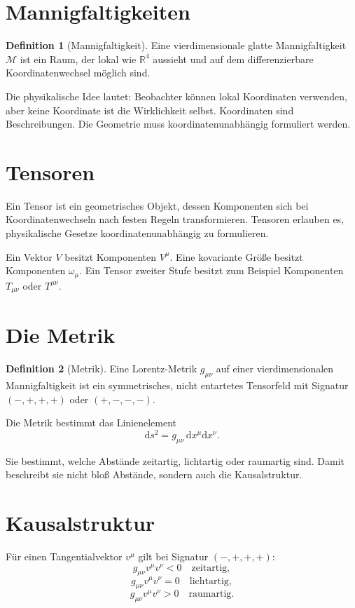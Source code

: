 \documentclass[11pt,a4paper,oneside]{book}
\theoremstyle{definition}
\newtheorem{definition}{Definition}[chapter]
\theoremstyle{plain}
\theoremstyle{remark}
\newcommand{\R}{\mathbb{R}}
\newcommand{\M}{\mathcal{M}}
\newcommand{\dd}{\mathrm{d}}
\begin{document}
\section{Mannigfaltigkeiten}
\begin{definition}[Mannigfaltigkeit]
Eine vierdimensionale glatte Mannigfaltigkeit $\M$ ist ein Raum, der lokal wie $\R^4$ aussieht und auf dem differenzierbare Koordinatenwechsel möglich sind.
\end{definition}

Die physikalische Idee lautet: Beobachter können lokal Koordinaten verwenden, aber keine Koordinate ist die Wirklichkeit selbst. Koordinaten sind Beschreibungen. Die Geometrie muss koordinatenunabhängig formuliert werden.

\section{Tensoren}
Ein Tensor ist ein geometrisches Objekt, dessen Komponenten sich bei Koordinatenwechseln nach festen Regeln transformieren. Tensoren erlauben es, physikalische Gesetze koordinatenunabhängig zu formulieren.

Ein Vektor $V$ besitzt Komponenten $V^\mu$. Eine kovariante Größe besitzt Komponenten $\omega_\mu$. Ein Tensor zweiter Stufe besitzt zum Beispiel Komponenten $T_{\mu\nu}$ oder $T^{\mu\nu}$.

\section{Die Metrik}
\begin{definition}[Metrik]
Eine Lorentz-Metrik $g_{\mu\nu}$ auf einer vierdimensionalen Mannigfaltigkeit ist ein symmetrisches, nicht entartetes Tensorfeld mit Signatur $(-,+,+,+)$ oder $(+,-,-,-)$.
\end{definition}

Die Metrik bestimmt das Linienelement
\[
\dd s^2 = g_{\mu\nu}\,\dd x^\mu\dd x^\nu.
\]

Sie bestimmt, welche Abstände zeitartig, lichtartig oder raumartig sind. Damit beschreibt sie nicht bloß Abstände, sondern auch die Kausalstruktur.

\section{Kausalstruktur}
Für einen Tangentialvektor $v^\mu$ gilt bei Signatur $(-,+,+,+)$:
\[
g_{\mu\nu}v^\mu v^\nu < 0 \quad \text{zeitartig},
\]
\[
g_{\mu\nu}v^\mu v^\nu = 0 \quad \text{lichtartig},
\]
\[
g_{\mu\nu}v^\mu v^\nu > 0 \quad \text{raumartig}.
\]
\end{document}
